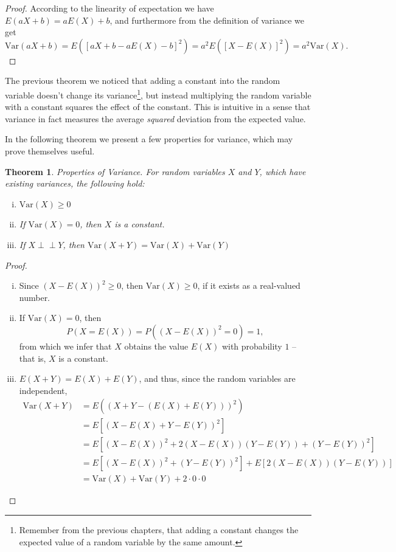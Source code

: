 \documentclass[12pt,a4paper,leqno]{report}
\newcommand{\var}{\mathrm{Var}}
\def\independent{\perp\!\!\!\perp}
\theoremstyle{plain}
\newtheorem{lause}[equation]{Theorem}
\theoremstyle{definition}
\begin{document}
\begin{proof}
\item According to the linearity of expectation we have $E(aX + b) = aE(X) + b$, and furthermore from the definition of variance we get
\[
\var(aX + b) = E([aX + b - aE(X) - b]^2) = a^2 E([X-E(X)]^2) = a^2 \var(X).
\]
\end{proof}

The previous theorem we noticed that adding a constant into the random variable doesn't change its variance\footnote{Remember from the previous chapters, that adding a constant changes the expected value of a random variable by the same amount.}, but instead multiplying the random variable with a constant squares the effect of the constant. This is intuitive in a sense that variance in fact measures the average \emph{squared} deviation from the expected value.

In the following theorem we present a few properties for variance, which may prove themselves useful.

\begin{lause} \label{lause:var_prop}
Properties of Variance.  For random variables $X$ and $Y$, which have existing variances, the following hold:
\begin{enumerate}[(i)]
\item $\var(X) \geq 0$
\item If $\var(X) = 0$, then $X$ is a constant.
\item If $X \independent Y$, then $\var(X+Y) = \var(X) + \var(Y)$ 
\end{enumerate}
\end{lause}

\begin{proof}
\rule{0pt}{3ex}
\begin{enumerate}[(i)]
\item Since $(X - E(X))^2 \geq 0$, then $\var(X) \geq 0$, if it exists as a real-valued number.
\item If $\var(X) = 0$, then
\[
P(X = E(X)) = P((X - E(X))^2 = 0) = 1,
\]
from which we infer that $X$ obtains the value $E(X)$ with probability $1$ -- that is, $X$ is a constant.
\item $E(X+Y) = E(X)+E(Y)$, and thus, since the random variables are independent,
\[
\begin{split}
\var(X+Y) &= E((X+Y - (E(X)+E(Y)))^2)\\
&= E[(X-E(X)+Y-E(Y))^2] \\
&= E[(X-E(X))^2+2(X-E(X))(Y-E(Y))+(Y-E(Y))^2] \\
&= E[(X-E(X))^2+(Y-E(Y))^2] + E[2(X-E(X))(Y-E(Y))] \\
&= \var(X) + \var(Y) + 2 \cdot 0 \cdot 0
\end{split}
\]
\end{enumerate}
\end{proof}
\end{document}
